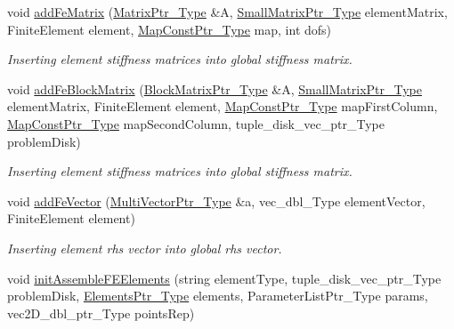 \begin{DoxyCompactItemize}
\item 
void \hyperlink{classFEDD_1_1FE__Test_aae827bac5afc6e83398c187fde2dc48c}{add\+Fe\+Matrix} (\hyperlink{classFEDD_1_1FE__Test_a3c2e34afc3a1495c2b00313399f12b3d}{Matrix\+Ptr\+\_\+\+Type} \&A, \hyperlink{classFEDD_1_1FE__Test_a675b52d9e58407c6baadb403394be92b}{Small\+Matrix\+Ptr\+\_\+\+Type} element\+Matrix, Finite\+Element element, \hyperlink{classFEDD_1_1FE__Test_ad09d94cdf8e7574fc9b6d1648fa18826}{Map\+Const\+Ptr\+\_\+\+Type} map, int dofs)
\begin{DoxyCompactList}\small\item\em Inserting element stiffness matrices into global stiffness matrix. \end{DoxyCompactList}\item 
void \hyperlink{classFEDD_1_1FE__Test_a7a56781f6a535f220c6047a8abf545da}{add\+Fe\+Block\+Matrix} (\hyperlink{classFEDD_1_1FE__Test_a2b1edc85a8fab435be53fb22b843af9d}{Block\+Matrix\+Ptr\+\_\+\+Type} \&A, \hyperlink{classFEDD_1_1FE__Test_a675b52d9e58407c6baadb403394be92b}{Small\+Matrix\+Ptr\+\_\+\+Type} element\+Matrix, Finite\+Element element, \hyperlink{classFEDD_1_1FE__Test_ad09d94cdf8e7574fc9b6d1648fa18826}{Map\+Const\+Ptr\+\_\+\+Type} map\+First\+Column, \hyperlink{classFEDD_1_1FE__Test_ad09d94cdf8e7574fc9b6d1648fa18826}{Map\+Const\+Ptr\+\_\+\+Type} map\+Second\+Column, tuple\+\_\+disk\+\_\+vec\+\_\+ptr\+\_\+\+Type problem\+Disk)
\begin{DoxyCompactList}\small\item\em Inserting element stiffness matrices into global stiffness matrix. \end{DoxyCompactList}\item 
void \hyperlink{classFEDD_1_1FE__Test_a91a2d157f4967fe1b198ade0cef4d63f}{add\+Fe\+Vector} (\hyperlink{classFEDD_1_1FE__Test_ac7c0363aa74e0bfcb903c13330c50185}{Multi\+Vector\+Ptr\+\_\+\+Type} \&a, vec\+\_\+dbl\+\_\+\+Type element\+Vector, Finite\+Element element)
\begin{DoxyCompactList}\small\item\em Inserting element rhs vector into global rhs vector. \end{DoxyCompactList}\item 
void \hyperlink{classFEDD_1_1FE__Test_a5cbe33c46976b681489edf73e8b4be4d}{init\+Assemble\+F\+E\+Elements} (string element\+Type, tuple\+\_\+disk\+\_\+vec\+\_\+ptr\+\_\+\+Type problem\+Disk, \hyperlink{classFEDD_1_1FE__Test_af8f5bc3cb82c5d60a3a63b1e5c89a678}{Elements\+Ptr\+\_\+\+Type} elements, Parameter\+List\+Ptr\+\_\+\+Type params, vec2\+D\+\_\+dbl\+\_\+ptr\+\_\+\+Type points\+Rep)

\end{DoxyCompactItemize}
